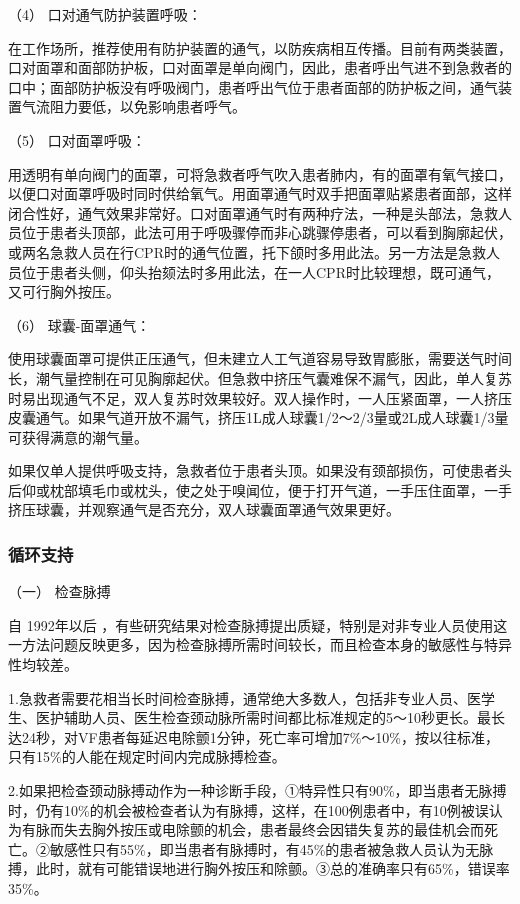\hypertarget{text00283.htmlux5cux23CHP10-1-4-3-2-4}{}
（4） 口对通气防护装置呼吸：

在工作场所，推荐使用有防护装置的通气，以防疾病相互传播。目前有两类装置，口对面罩和面部防护板，口对面罩是单向阀门，因此，患者呼出气进不到急救者的口中；面部防护板没有呼吸阀门，患者呼出气位于患者面部的防护板之间，通气装置气流阻力要低，以免影响患者呼气。

\hypertarget{text00283.htmlux5cux23CHP10-1-4-3-2-5}{}
（5） 口对面罩呼吸：

用透明有单向阀门的面罩，可将急救者呼气吹入患者肺内，有的面罩有氧气接口，以便口对面罩呼吸时同时供给氧气。用面罩通气时双手把面罩贴紧患者面部，这样闭合性好，通气效果非常好。口对面罩通气时有两种疗法，一种是头部法，急救人员位于患者头顶部，此法可用于呼吸骤停而非心跳骤停患者，可以看到胸廓起伏，或两名急救人员在行CPR时的通气位置，托下颌时多用此法。另一方法是急救人员位于患者头侧，仰头抬颏法时多用此法，在一人CPR时比较理想，既可通气，又可行胸外按压。

\hypertarget{text00283.htmlux5cux23CHP10-1-4-3-2-6}{}
（6） 球囊-面罩通气：

使用球囊面罩可提供正压通气，但未建立人工气道容易导致胃膨胀，需要送气时间长，潮气量控制在可见胸廓起伏。但急救中挤压气囊难保不漏气，因此，单人复苏时易出现通气不足，双人复苏时效果较好。双人操作时，一人压紧面罩，一人挤压皮囊通气。如果气道开放不漏气，挤压1L成人球囊1/2～2/3量或2L成人球囊1/3量可获得满意的潮气量。

如果仅单人提供呼吸支持，急救者位于患者头顶。如果没有颈部损伤，可使患者头后仰或枕部填毛巾或枕头，使之处于嗅闻位，便于打开气道，一手压住面罩，一手挤压球囊，并观察通气是否充分，双人球囊面罩通气效果更好。

\subsubsection{循环支持}

\hypertarget{text00283.htmlux5cux23CHP10-1-4-4-1}{}
（一） 检查脉搏

自 1992年以后
，有些研究结果对检查脉搏提出质疑，特别是对非专业人员使用这一方法问题反映更多，因为检查脉搏所需时间较长，而且检查本身的敏感性与特异性均较差。

1.急救者需要花相当长时间检查脉搏，通常绝大多数人，包括非专业人员、医学生、医护辅助人员、医生检查颈动脉所需时间都比标准规定的5～10秒更长。最长达24秒，对VF患者每延迟电除颤1分钟，死亡率可增加7\%～10\%，按以往标准，只有15\%的人能在规定时间内完成脉搏检查。

2.如果把检查颈动脉搏动作为一种诊断手段，①特异性只有90\%，即当患者无脉搏时，仍有10\%的机会被检查者认为有脉搏，这样，在100例患者中，有10例被误认为有脉而失去胸外按压或电除颤的机会，患者最终会因错失复苏的最佳机会而死亡。②敏感性只有55\%，即当患者有脉搏时，有45\%的患者被急救人员认为无脉搏，此时，就有可能错误地进行胸外按压和除颤。③总的准确率只有65\%，错误率35\%。


